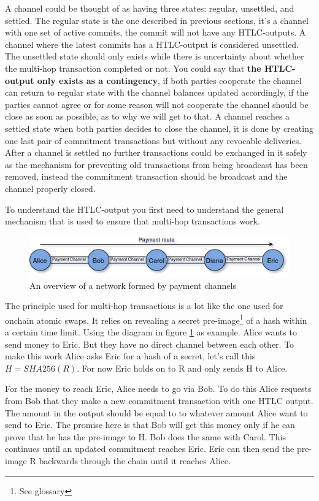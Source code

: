 A channel could be thought of as having three states: regular, unsettled, and settled. The regular state is the one described in previous sections, it's a channel with one set of active commits, the commit will not have any HTLC-outputs. A channel where the latest commits has a HTLC-output is considered unsettled. The unsettled state should only exists while there is uncertainty about whether the multi-hop transaction completed or not. You could say that \textbf{the HTLC-output only exists as a contingency}, if both parties cooperate the channel can return to regular state with the channel balances updated accordingly, if the parties cannot agree or for some reason will not cooperate the channel should be close as soon as possible, as to why we will get to that. A channel reaches a settled state when both parties decides to close the channel, it is done by creating one last pair of commitment transactions but without any revocable deliveries. After a channel is settled no further transactions could be exchanged in it safely as the mechanism for preventing old transactions from being broadcast has been removed, instead the commitment transaction should be broadcast and the channel properly closed.

To understand the HTLC-output you first need to understand the general mechanism that is used to ensure that multi-hop transactions work. 

\begin{figure}[H]
	\centering
	\includegraphics[width=1\textwidth]{background/images/ln_route.png}
	\caption{An overview of a network formed by payment channels}
	\label{fig:pc-route}
\end{figure}

The principle used for multi-hop transactions is a lot like the one used for onchain atomic swaps. It relies on revealing a secret pre-image\footnote{See glossary} of a hash within a certain time limit. Using the diagram in figure \ref{fig:pc-route} as example. Alice wants to send money to Eric. But they have no direct channel between each other. To make this work Alice asks Eric for a hash of a secret, let's call this $H = SHA256(R)$. For now Eric holds on to R and only sends H to Alice.

For the money to reach Eric, Alice needs to go via Bob. To do this Alice requests from Bob that they make a new commitment transaction with one HTLC output. The amount in the output should be equal to to whatever amount Alice want to send to Eric. The promise here is that Bob will get this money only if he can prove that he has the pre-image to H. Bob does the same with Carol. This continues until an updated commitment reaches Eric. Eric can then send the pre-image R backwards through the chain until it reaches Alice. 

